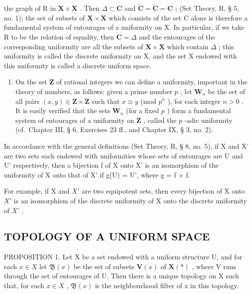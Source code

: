 the graph of R in \(\mathbf{X} \times \mathbf{X}\) . Then \(\Delta \subset \mathbf{C}\) and \(\tilde{\mathbf{C}} = \tilde{\mathbf{C}} = \mathbf{C}\) ; (Set Theory, R, § 5, no. 1); the set of subsets of \(\mathbf{X} \times \mathbf{X}\) which consists of the set C alone is therefore a fundamental system of entourages of a uniformity on X. In particular, if we take R to be the relation of equality, then \(\mathbf{C} = \Delta\) and the entourages of the corresponding uniformity are all the subsets of \(\mathbf{X} \times \mathbf{X}\) which contain \(\Delta\) ; this uniformity is called the discrete uniformity on X, and the set X endowed with this uniformity is called a discrete uniform space.

\begin{enumerate}
\def\labelenumi{\arabic{enumi})}
\setcounter{enumi}{2}
\tightlist
\item
  On the set \(\mathbf{Z}\) of rational integers we can define a uniformity, important in the theory of numbers, as follows: given a prime number \(p\) , let \(\mathbf{W}_n\) be the set of all pairs \((x,y)\in \mathbf{Z}\times \mathbf{Z}\) such that \(x\equiv y\) (mod \(p^n\) ), for each integer \(n > 0\) . It is easily verified that the sets \(\mathbf{W}_n\) (for a fixed \(p\) ) form a fundamental system of entourages of a uniformity on \(\mathbf{Z}\) , called the \(p\) -adic uniformity (cf.~Chapter III, § 6, Exercises 23 ff., and Chapter IX, § 3, no. 2).
\end{enumerate}

In accordance with the general definitions (Set Theory, R, § 8, no. 5), if X and X' are two sets each endowed with uniformities whose sets of entourages are U and U' respectively, then a bijection f of X onto X' is an isomorphism of the uniformity of X onto that of X' if g(U) = U', where g = f × f.

For example, if X and \(X'\) are two equipotent sets, then every bijection of X onto \(X'\) is an isomorphism of the discrete uniformity of X onto the discrete uniformity of \(X'\) .

\subsection{TOPOLOGY OF A UNIFORM SPACE}

PROPOSITION 1. Let X be a set endowed with a uniform structure U, and for each \(x \in X\) let \(\mathfrak{B}(x)\) be the set of subsets \(\mathbf{V}(x)\) of \(\mathbf{X}(*)\) , where V runs through the set of entourages of U. Then there is a unique topology on X such that, for each \(x \in X\) , \(\mathfrak{B}(x)\) is the neighbourhood filter of x in this topology.


